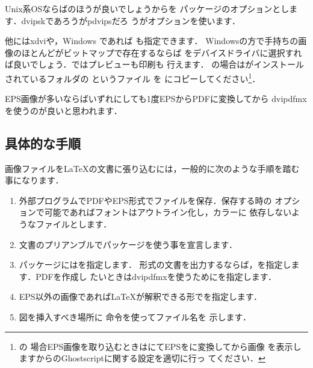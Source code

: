 \begin{intext}
 \usepackage[dvipdfm]{graphicx}
\end{intext}

Unix系OSならば{\PS}のほうが良いでしょうからを
パッケージのオプションとします．{dvipsk}であろうが{pdvips}だろ
うがオプションを使います．

他には{xdvi}や，Windows であれば \Dviout も指定できます．
Windowsの方で手持ちの画像のほとんどがビットマップで存在するならば\Dviout
をデバイスドライバに選択すれば良いでしょう．\Dviout ではプレビューも印刷も
行えます．
\Dviout の場合は\Dviout がインストールされているフォルダの
というファイル
を  にコピーしてください\footnote{\Dviout の
場合EPS画像を取り込むときは{\GS}にてEPSをに変換してから画像
を表示しますから{\Dviout}の{Ghostscript}に関する設定を適切に行っ
てください．}．

EPS画像が多いならばいずれにしても1度EPSからPDFに変換してから
{dvipdfmx}を使うのが良いと思われます．%


\subsection{具体的な手順}

画像ファイルを\LaTeX の文書に張り込むには，一般的に次のような手順を踏む
事になります．

\begin{enumerate}
%
%
\item 外部プログラムでPDFやEPS形式でファイルを保存．保存する時の
      オプションで可能であればフォントはアウトライン化し，カラーに
      依存しないようなファイルとします．
\item 文書のプリアンブルでパッケージを使う事を宣言します．
\item {}パッケージにはを指定します．
      \PS 形式の文書を出力するならば，を指定します．PDFを作成し
      たいときは{dvipdfmx}を使うためにを指定します．
\item EPS以外の画像であれば\LaTeX が解釈できる形でを指定します．
\item  図を挿入すべき場所に 命令を使ってファイル名を
      示します．
\end{enumerate}

